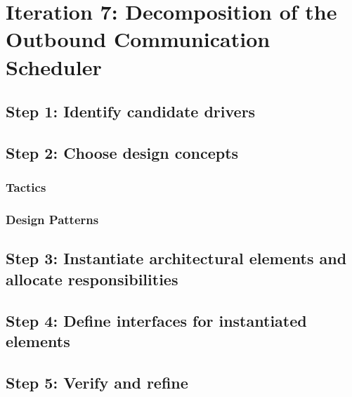 \section{Iteration 7: Decomposition of the Outbound Communication Scheduler}
\label{add:it7}

\subsection{Step 1: Identify candidate drivers}
\label{add:it7/drivers}

\subsection{Step 2: Choose design concepts}
\label{add:it7/concepts}

\subsubsection{Tactics}
\label{add:it7/tactics}

\subsubsection{Design Patterns}
\label{add:it7/patterns}

\subsection{Step 3: Instantiate architectural elements and allocate responsibilities}
\label{add:it7/elements}

\subsection{Step 4: Define interfaces for instantiated elements}
\label{add:it7/interfaces}

\subsection{Step 5: Verify and refine}
\label{add:it7/verification}